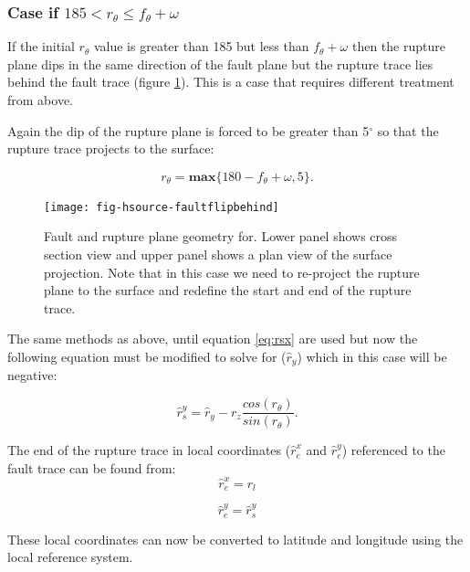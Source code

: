 \subsubsection{Case if  $185 <  r_\theta \leq f_\theta + \omega$} \label{sec:180to270}

If the initial $r_\theta$ value is greater than 185 but less than $f_\theta + \omega$ then the rupture 
plane dips in the same direction of the fault plane but the rupture trace lies behind the fault trace (figure \ref{fig:gt180}). This is a case that requires different
treatment from above.

Again the dip of the rupture plane is forced to be greater than 5$^\circ$ so 
that the rupture trace projects to the surface:

\begin{equation}
r_\theta = \mathbf{max} \{ 180 - f_\theta + \omega, 5 \} .
\end{equation}

\begin{figure}[htp]
\centerline{\texttt{[image: fig-hsource-faultflipbehind]}}
\caption{Fault and rupture plane geometry for. Lower panel shows cross section view and upper panel shows 
a plan view of the surface projection. Note that in this case we need to re-project the rupture plane to 
the surface and redefine the start and end of the rupture trace.}
\label{fig:gt180}
\end{figure}

The same methods as above, until equation \ref{eq:rsx} are used but now the following equation must be modified
to solve for ($\hat{r}_y$) which in this case will be negative:

\begin{equation}\label{eq:ry4}
\hat{r}_s^y = \hat{r}_y -  r_z  \frac{cos(r_\theta)}{sin(r_\theta)}.
\end{equation}

The end of the rupture trace in local coordinates ($\hat{r}_e^x$ and $\hat{r}_e^y$) referenced to the fault 
trace can be found from:
\begin{equation}
\hat{r}_e^x = r_l
\end{equation}

\begin{equation}
\hat{r}_e^y = \hat{r}_s^y
\end{equation}

These local coordinates can now be converted to latitude and longitude using the local reference system. 


